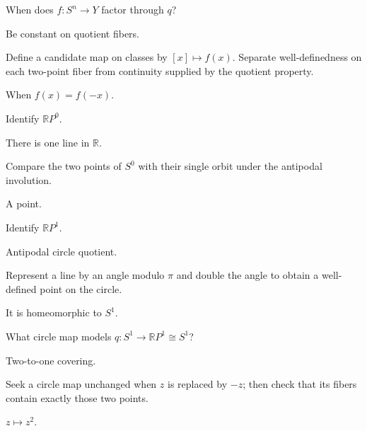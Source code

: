 \begin{exercise}\label{exr:viii04-13}
When does \(f:S^n\to Y\) factor through \(q\)?
\end{exercise}
\begin{hint}
Be constant on quotient fibers.

Define a candidate map on classes by \([x]\mapsto f(x)\). Separate well-definedness on each two-point fiber from continuity supplied by the quotient property.
\end{hint}
\begin{solution}
When \(f(x)=f(-x)\).
\end{solution}

\begin{exercise}\label{exr:viii04-14}
Identify \(\mathbb RP^0\).
\end{exercise}
\begin{hint}
There is one line in \(\mathbb R\).

Compare the two points of \(S^0\) with their single orbit under the antipodal involution.
\end{hint}
\begin{solution}
A point.
\end{solution}

\begin{exercise}\label{exr:viii04-15}
Identify \(\mathbb RP^1\).
\end{exercise}
\begin{hint}
Antipodal circle quotient.

Represent a line by an angle modulo \(\pi\) and double the angle to obtain a well-defined point on the circle.
\end{hint}
\begin{solution}
It is homeomorphic to \(S^1\).
\end{solution}

\begin{exercise}\label{exr:viii04-16}
What circle map models \(q:S^1\to\mathbb RP^1\cong S^1\)?
\end{exercise}
\begin{hint}
Two-to-one covering.

Seek a circle map unchanged when \(z\) is replaced by \(-z\); then check that its fibers contain exactly those two points.
\end{hint}
\begin{solution}
\(z\mapsto z^2\).
\end{solution}

